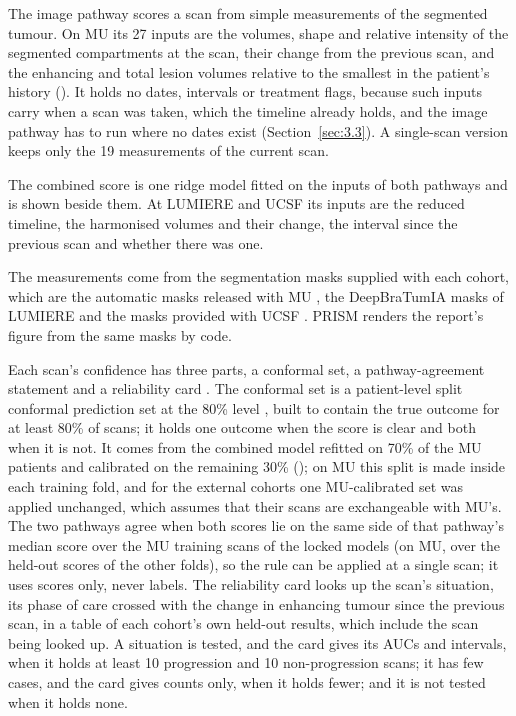 \documentclass[largeformat]{interact} %
\begin{document}
The image pathway scores a scan from simple measurements of the segmented tumour. On MU its 27 inputs are the
volumes, shape and relative intensity of the segmented compartments at the scan, their change from the previous
scan, and the enhancing and total lesion volumes relative to the smallest in the patient's history
(). It holds no dates,
intervals or treatment flags, because such inputs carry when a scan was taken, which the timeline already holds, and
the image pathway has to run where no dates exist (Section~\ref{sec:3.3}). A single-scan version keeps only the 19
measurements of the current scan.

The combined score is one ridge model fitted on the inputs of both pathways and is shown beside them. At LUMIERE and
UCSF its inputs are the reduced timeline, the harmonised volumes and their change, the interval since the previous
scan and whether there was one.

The measurements come from the segmentation masks supplied with each cohort, which are the automatic masks released with MU
\citep{mahmoud2025}, the DeepBraTumIA masks of LUMIERE \citep{suter2022} and the masks provided with UCSF
\citep{fields2024}. PRISM renders the report's figure from the same masks by code.

Each scan's confidence has three parts, a conformal set, a pathway-agreement statement and a reliability card
\citep{mitchell2019}. The conformal set is a patient-level split conformal prediction set at the 80\% level
\citep{angelopoulos2023}, built to contain the true outcome for at least 80\% of scans; it holds one outcome when
the score is clear and both when it is not. It comes from the combined model refitted on 70\% of the MU patients and calibrated on the remaining 30\% (); on
MU this split is made inside each training fold, and for the external cohorts one MU-calibrated set was applied
unchanged, which assumes that their scans are exchangeable with MU's.  The two pathways agree when both scores lie on the same side of that
pathway's median score over the MU training scans of the locked models (on MU, over the held-out scores of the other
folds), so the rule can be applied at a single scan; it uses scores only, never labels. The reliability
card looks up the scan's situation, its phase of care crossed with the change in enhancing tumour since the previous
scan, in a table of each cohort's own held-out results, which include the scan being looked up. A situation is
tested, and the card gives its AUCs and intervals, when it holds at least 10 progression and 10 non-progression
scans; it has few cases, and the card gives counts only, when it holds fewer; and it is not tested when it holds none.
\end{document}
